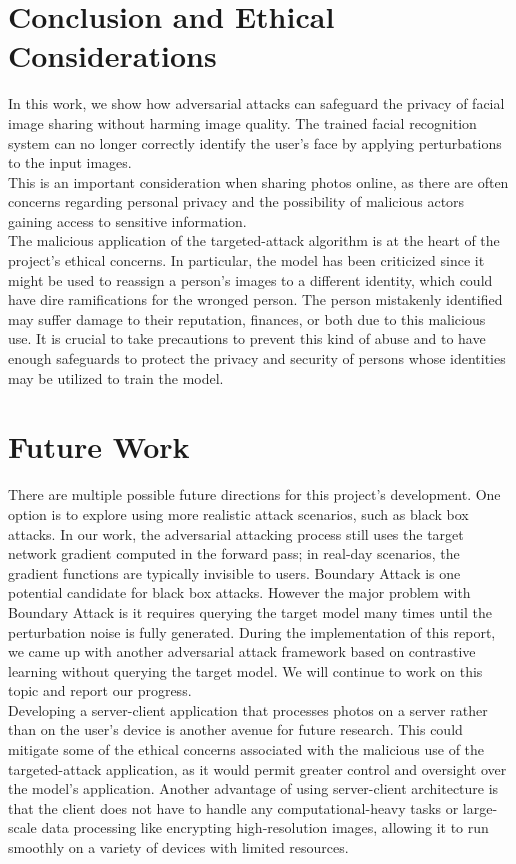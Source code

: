 \section{Conclusion and Ethical Considerations}

In this work, we show how adversarial attacks can safeguard the privacy of facial image sharing without harming image quality. The trained facial recognition system can no longer correctly identify the user's face by applying perturbations to the input images. \\

This is an important consideration when sharing photos online, as there are often concerns regarding personal privacy and the possibility of malicious actors gaining access to sensitive information. \\

The malicious application of the targeted-attack algorithm is at the heart of the project's ethical concerns. In particular, the model has been criticized since it might be used to reassign a person's images to a different identity, which could have dire ramifications for the wronged person. The person mistakenly identified may suffer damage to their reputation, finances, or both due to this malicious use. It is crucial to take precautions to prevent this kind of abuse and to have enough safeguards to protect the privacy and security of persons whose identities may be utilized to train the model.


\section{Future Work}

There are multiple possible future directions for this project's development. One option is to explore using more realistic attack scenarios, such as black box attacks. In our work, the adversarial attacking process still uses the target network gradient computed in the forward pass; in real-day scenarios, the gradient functions are typically invisible to users. Boundary Attack is one potential candidate for black box attacks. However the major problem with Boundary Attack is it requires querying the target model many times until the perturbation noise is fully generated. During the implementation of this report, we came up with another adversarial attack framework based on contrastive learning without querying the target model. We will continue to work on this topic and report our progress. \\

Developing a server-client application that processes photos on a server rather than on the user's device is another avenue for future research. This could mitigate some of the ethical concerns associated with the malicious use of the targeted-attack application, as it would permit greater control and oversight over the model's application. Another advantage of using server-client architecture is that the client does not have to handle any computational-heavy tasks or large-scale data processing like encrypting high-resolution images, allowing it to run smoothly on a variety of devices with limited resources.

